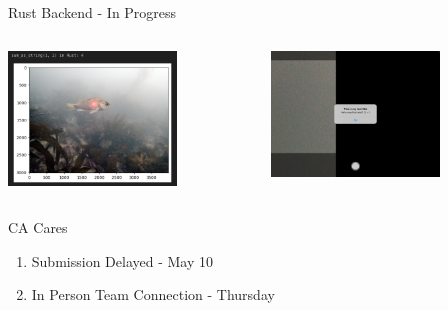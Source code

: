 \begin{frame}{Rust Backend - In Progress}
    \begin{columns}
        \begin{column}{0.5\textwidth}
            \includegraphics[height=0.7\textheight,width=0.7\textwidth,keepaspectratio]{images/fs_cli_rust.png}
        \end{column}
        \begin{column}{0.5\textwidth}
            \includegraphics[height=0.7\textheight,width=0.7\textwidth,keepaspectratio]{images/fs_ipad_rust.png}
        \end{column}
    \end{columns}
\end{frame}

\begin{frame}{CA Cares}
    \begin{enumerate}
        \item Submission Delayed - May 10
        \item In Person Team Connection - Thursday
    \end{enumerate}
\end{frame}


